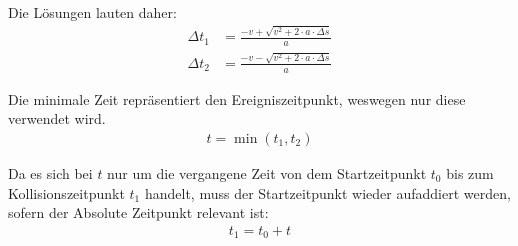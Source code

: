 Die Lösungen lauten daher:
\begin{align}
    \Delta t_1 &= \frac{-v + \sqrt{v^2 + 2 \cdot a \cdot \Delta s}}{a}\\
    \Delta t_2 &= \frac{-v - \sqrt{v^2 + 2 \cdot a \cdot \Delta s}}{a}
\end{align}

Die minimale Zeit repräsentiert den Ereigniszeitpunkt, weswegen nur diese verwendet wird.
\begin{align}
    t = \min(t_1, t_2)
\end{align}

Da es sich bei $t$ nur um die vergangene Zeit von dem Startzeitpunkt $t_0$ bis zum Kollisionszeitpunkt $t_1$ handelt,
muss der Startzeitpunkt wieder aufaddiert werden, sofern der Absolute Zeitpunkt relevant ist:
\begin{align}
    t_1 = t_0 + t
\end{align}
